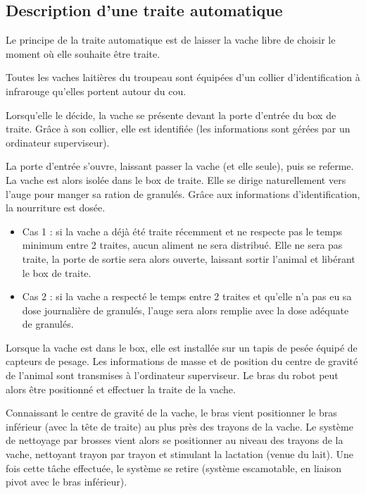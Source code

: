 \subsection{Description d’une traite automatique}

Le principe de la traite automatique est de laisser la vache libre de choisir le moment où elle souhaite être traite.

Toutes les vaches laitières du troupeau sont équipées d’un collier d’identification à infrarouge qu’elles portent autour du cou.

Lorsqu’elle le décide, la vache se présente devant la porte d’entrée du box de traite. Grâce à son collier, elle est identifiée (les informations sont gérées par un ordinateur superviseur).

La porte d’entrée s’ouvre, laissant passer la vache (et elle seule), puis se referme. La vache est alors isolée dans le box de traite. Elle se dirige naturellement vers l’auge pour manger sa ration de granulés. Grâce aux informations d’identification, la nourriture est dosée.

\begin{itemize}
 \item Cas 1 : si la vache a déjà été traite récemment et ne respecte pas le temps minimum entre 2 traites, aucun aliment ne sera distribué. Elle ne sera pas traite, la porte de sortie sera alors ouverte, laissant sortir l’animal et libérant le box de traite.
 \item Cas 2 : si la vache a respecté le temps entre 2 traites et qu’elle n’a pas eu sa dose journalière de granulés, l’auge sera alors remplie avec la dose adéquate de granulés.
\end{itemize} 

Lorsque la vache est dans le box, elle est installée sur un tapis de pesée équipé de capteurs de pesage. Les informations de masse et de position du centre de gravité de l’animal sont transmises à l’ordinateur superviseur. Le bras du robot peut alors être positionné et effectuer la traite de la vache.

Connaissant le centre de gravité de la vache, le bras vient positionner le bras inférieur (avec la tête de traite) au plus près des trayons de la vache. Le système de nettoyage par brosses vient alors se positionner au niveau des trayons de la vache, nettoyant trayon par trayon et stimulant la lactation (venue du lait). Une fois cette tâche effectuée, le système se retire (système escamotable, en liaison pivot avec le bras inférieur).

